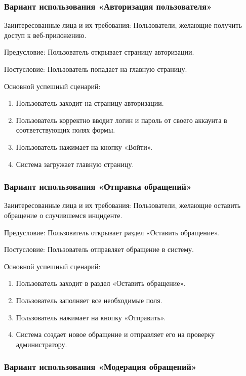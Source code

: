 \subsubsection {Вариант использования «Авторизация пользователя»}
Заинтересованные лица и их требования: Пользователи, желающие получить доступ к веб-приложению.

Предусловие: Пользователь открывает страницу авторизации.

Постусловие: Пользователь попадает на главную страницу.

Основной успешный сценарий: 
\begin{enumerate}
	\item Пользователь заходит на страницу авторизации.
	\item Пользователь корректно вводит логин и пароль от своего аккаунта в соответствующих полях формы.
	\item Пользователь нажимает на кнопку «Войти».
	\item Система загружает главную страницу.
\end{enumerate}

\subsubsection {Вариант использования «Отправка обращений»}

Заинтересованные лица и их требования: Пользователи, желающие оставить обращение о случившемся инциденте.

Предусловие: Пользователь открывает раздел «Оставить обращение».

Постусловие: Пользователь отправляет обращение в систему.

Основной успешный сценарий: 

\begin{enumerate}
	\item Пользователь заходит в раздел «Оставить обращение».
	\item Пользователь заполняет все необходимые поля.
	\item Пользователь нажимает на кнопку «Отправить».
	\item Система создает новое обращение и отправляет его на проверку администратору.
\end{enumerate}

\subsubsection {Вариант использования «Модерация обращений»}

